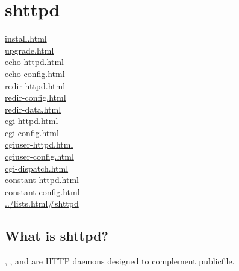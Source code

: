 
\chapter{shttpd}

\begin{chapterintro}
\href{How to install shttpd}{install.html}\\
\href{How to upgrade shttpd}{upgrade.html}\\

\href{The \cmd{echo-httpd} program}{echo-httpd.html}\\
\href{The \cmd{echo-config} program}{echo-config.html}\\

\href{The \cmd{redir-httpd} program}{redir-httpd.html}\\
\href{The \cmd{redir-config} program}{redir-config.html}\\
\href{The \cmd{redir-data} program}{redir-data.html}\\

\href{The \cmd{cgi-httpd} program}{cgi-httpd.html}\\
\href{The \cmd{cgi-config} program}{cgi-config.html}\\

\href{The \cmd{cgiuser-httpd} program}{cgiuser-httpd.html}\\
\href{The \cmd{cgiuser-config} program}{cgiuser-config.html}\\

\href{The \cmd{cgi-dispatch} program}{cgi-dispatch.html}\\

\href{The \cmd{constant-httpd} program}{constant-httpd.html}\\
\href{The \cmd{constant-config} program}{constant-config.html}\\

\href{A mailing list for shttpd discussion}{../lists.html\#shttpd}\\
\end{chapterintro}

\section{What is shttpd?}
, , and  are HTTP
daemons designed to complement publicfile.

